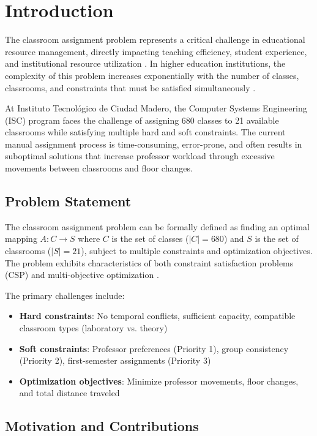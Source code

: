 \documentclass[algorithms,article,submit,pdftex,moreauthors]{Definitions/mdpi}
\begin{document}
\section{Introduction}

The classroom assignment problem represents a critical challenge in educational resource management, directly impacting teaching efficiency, student experience, and institutional resource utilization \citep{ref-babaei2015}. In higher education institutions, the complexity of this problem increases exponentially with the number of classes, classrooms, and constraints that must be satisfied simultaneously \citep{ref-schaerf1999}.

At Instituto Tecnológico de Ciudad Madero, the Computer Systems Engineering (ISC) program faces the challenge of assigning 680 classes to 21 available classrooms while satisfying multiple hard and soft constraints. The current manual assignment process is time-consuming, error-prone, and often results in suboptimal solutions that increase professor workload through excessive movements between classrooms and floor changes.

\subsection{Problem Statement}

The classroom assignment problem can be formally defined as finding an optimal mapping $A: C \rightarrow S$ where $C$ is the set of classes ($|C|=680$) and $S$ is the set of classrooms ($|S|=21$), subject to multiple constraints and optimization objectives. The problem exhibits characteristics of both constraint satisfaction problems (CSP) and multi-objective optimization \citep{ref-lewis2007}.

The primary challenges include:
\begin{itemize}
\item \textbf{Hard constraints}: No temporal conflicts, sufficient capacity, compatible classroom types (laboratory vs. theory)
\item \textbf{Soft constraints}: Professor preferences (Priority 1), group consistency (Priority 2), first-semester assignments (Priority 3)
\item \textbf{Optimization objectives}: Minimize professor movements, floor changes, and total distance traveled
\end{itemize}

\subsection{Motivation and Contributions}
\end{document}
